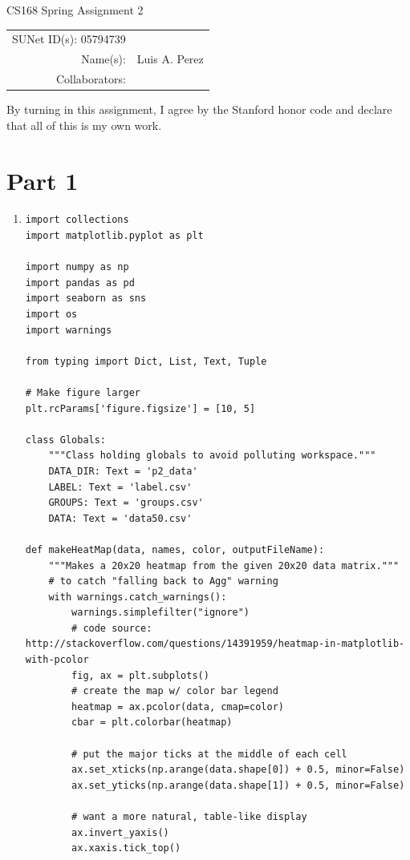 \documentclass[12pt]{article}
\begin{document}
\begin{center}
{\Large CS168 Spring Assignment 2}

\begin{tabular}{rl}
SUNet ID(s): 05794739 & \\
Name(s): & Luis A. Perez \\
Collaborators: &
\end{tabular}
\end{center}

By turning in this assignment, I agree by the Stanford honor code and declare
that all of this is my own work.

\section*{Part 1}

\begin{enumerate}[label=(\alph*)]
  \item
    \begin{verbatim}
import collections
import matplotlib.pyplot as plt

import numpy as np
import pandas as pd
import seaborn as sns
import os
import warnings

from typing import Dict, List, Text, Tuple

# Make figure larger
plt.rcParams['figure.figsize'] = [10, 5]

class Globals:
    """Class holding globals to avoid polluting workspace."""
    DATA_DIR: Text = 'p2_data'
    LABEL: Text = 'label.csv'
    GROUPS: Text = 'groups.csv'
    DATA: Text = 'data50.csv'

def makeHeatMap(data, names, color, outputFileName):
    """Makes a 20x20 heatmap from the given 20x20 data matrix."""
    # to catch "falling back to Agg" warning
    with warnings.catch_warnings():
        warnings.simplefilter("ignore")
        # code source: http://stackoverflow.com/questions/14391959/heatmap-in-matplotlib-with-pcolor
        fig, ax = plt.subplots()
        # create the map w/ color bar legend
        heatmap = ax.pcolor(data, cmap=color)
        cbar = plt.colorbar(heatmap)

        # put the major ticks at the middle of each cell
        ax.set_xticks(np.arange(data.shape[0]) + 0.5, minor=False)
        ax.set_yticks(np.arange(data.shape[1]) + 0.5, minor=False)

        # want a more natural, table-like display
        ax.invert_yaxis()
        ax.xaxis.tick_top()


\end{verbatim}
\end{enumerate}
\end{document}
